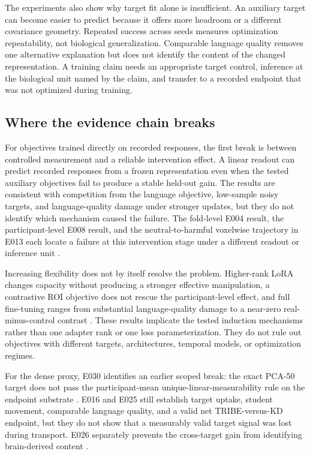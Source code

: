 The experiments also show why target fit alone is insufficient.
An auxiliary target can become easier to predict because it offers more headroom or a different covariance geometry.
Repeated success across seeds measures optimization repeatability, not biological generalization.
Comparable language quality removes one alternative explanation but does not identify the content of the changed representation.
A training claim needs an appropriate target control, inference at the biological unit named by the claim, and transfer to a recorded endpoint that was not optimized during training.

\subsection{Where the evidence chain breaks}

For objectives trained directly on recorded responses, the first break is between controlled measurement and a reliable intervention effect.
A linear readout can predict recorded responses from a frozen representation even when the tested auxiliary objectives fail to produce a stable held-out gain.
The results are consistent with competition from the language objective, low-sample noisy targets, and language-quality damage under stronger updates, but they do not identify which mechanism caused the failure.
The fold-level E004 result, the participant-level E008 result, and the neutral-to-harmful voxelwise trajectory in E013 each locate a failure at this intervention stage under a different readout or inference unit   .

Increasing flexibility does not by itself resolve the problem.
Higher-rank LoRA changes capacity without producing a stronger effective manipulation, a contrastive ROI objective does not rescue the participant-level effect, and full fine-tuning ranges from substantial language-quality damage to a near-zero real-minus-control contrast .
These results implicate the tested induction mechanisms rather than one adapter rank or one loss parameterization.
They do not rule out objectives with different targets, architectures, temporal models, or optimization regimes.

For the dense proxy, E030 identifies an earlier scoped break: the exact PCA-50 target does not pass the participant-mean unique-linear-measurability rule on the endpoint substrate .
E016 and E025 still establish target uptake, student movement, comparable language quality, and a valid net TRIBE-versus-KD endpoint, but they do not show that a measurably valid target signal was lost during transport.
E026 separately prevents the cross-target gain from identifying brain-derived content .

